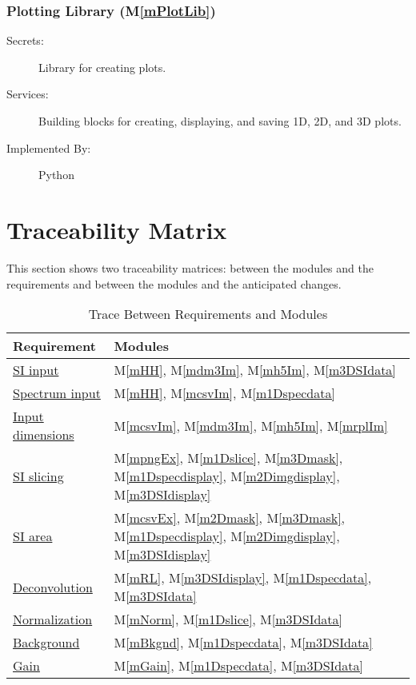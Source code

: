 \documentclass[12pt, titlepage]{article}
\newcommand{\mref}[1]{M\ref{#1}}
\begin{document}
\subsubsection{Plotting Library (\mref{mPlotLib})}
\label{sssec:PlotLib}
\begin{description}
	\item[Secrets:]Library for creating plots.
	\item[Services:]Building blocks for creating, displaying, and saving 1D, 2D,
    and 3D plots.
	\item[Implemented By:] Python
\end{description}

\section{Traceability Matrix} \label{SecTM}

This section shows two traceability matrices: between the modules and the
requirements and between the modules and the anticipated changes.

\begin{table}[H]
	\centering
	\begin{tabular}{p{} p{}}
		\toprule
		\textbf{Requirement} & \textbf{Modules}\\
		\midrule
		\hyperref[R_SI_inputs]{SI input} & \mref{mHH}, \mref{mdm3Im}, \mref{mh5Im},
\mref{m3DSIdata}\\
		\hyperref[R_spectrum_inputs]{Spectrum input} & \mref{mHH}, \mref{mcsvIm},
\mref{m1Dspecdata}\\
		\hyperref[R_Input_dimension]{Input dimensions} & \mref{mcsvIm}, \mref{mdm3Im},
\mref{mh5Im}, \mref{mrplIm}\\
		\hyperref[R_SI_slicing]{SI slicing} & \mref{mpngEx}, \mref{m1Dslice},
\mref{m3Dmask}, \mref{m1Dspecdisplay}, \mref{m2Dimgdisplay},
\mref{m3DSIdisplay}\\
		\hyperref[R_SI_area]{SI area} & \mref{mcsvEx}, \mref{m2Dmask}, \mref{m3Dmask},
\mref{m1Dspecdisplay}, \mref{m2Dimgdisplay}, \mref{m3DSIdisplay}\\
		\hyperref[R_deconvolution]{Deconvolution} & \mref{mRL}, \mref{m3DSIdisplay},
\mref{m1Dspecdata}, \mref{m3DSIdata}\\
		\hyperref[R_normalization]{Normalization} & \mref{mNorm}, \mref{m1Dslice},
\mref{m3DSIdata}\\
		\hyperref[R_background]{Background} & \mref{mBkgnd}, \mref{m1Dspecdata},
\mref{m3DSIdata}\\
		\hyperref[R_gain]{Gain} & \mref{mGain}, \mref{m1Dspecdata}, \mref{m3DSIdata}\\
		\bottomrule
	\end{tabular}
	\caption{Trace Between Requirements and Modules}
	\label{TblRT}
\end{table}
\end{document}
